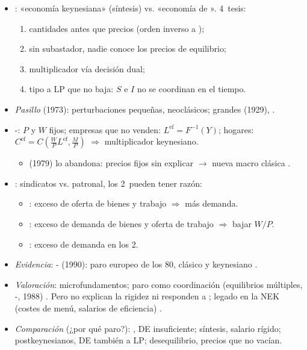 \documentclass{article}
\begin{document}
\begin{columnas}
\begin{itemize}
\item {}: «economía keynesiana» (síntesis) vs. «economía de ». 4~tesis:
  \begin{enumerate}
  \item cantidades antes que precios (orden inverso a );
  \item sin subastador, nadie conoce los precios de equilibrio;
  \item multiplicador vía decisión dual;
  \item tipo a LP que no baja: $S$ e $I$ no se coordinan en el tiempo.
  \end{enumerate}
\item \emph{Pasillo} (1973): perturbaciones pequeñas, neoclásicos; grandes (1929), .
\end{itemize}
\begin{itemize}
\item {}-: $P$ y $W$ fijos; empresas que no venden: $L^{\mathrm{ef}}=F^{-1}(Y)$; hogares: $C^{\mathrm{ef}}=C(\tfrac WP L^{\mathrm{ef}},\tfrac MP)$ $\Rightarrow$ multiplicador keynesiano.
  \begin{itemize}
  \item {} (1979) lo abandona: precios fijos sin explicar $\to$ nueva macro clásica .
  \end{itemize}
\item {}: sindicatos vs. patronal, los 2~pueden tener razón:
  \begin{itemize}
  \item {}: exceso de oferta de bienes y trabajo $\Rightarrow$ más demanda.
  \item {}: exceso de demanda de bienes y oferta de trabajo $\Rightarrow$ bajar $W/P$.
  \item {}: exceso de demanda en los 2.
  \end{itemize}
\end{itemize}
\begin{itemize}
\item \emph{Evidencia}: - (1990): paro europeo de los 80, clásico y keynesiano .
\item \emph{Valoración}: microfundamentos; paro como coordinación (equilibrios múltiples, -, 1988) . Pero no explican la rigidez ni responden a ; legado en la NEK (costes de menú, salarios de eficiencia) .
\item \emph{Comparación} (¿por qué paro?): , DE insuficiente; síntesis, salario rígido; postkeynesianos, DE también a LP; desequilibrio, precios que no vacían.
\end{itemize}


\end{columnas}
\end{document}
